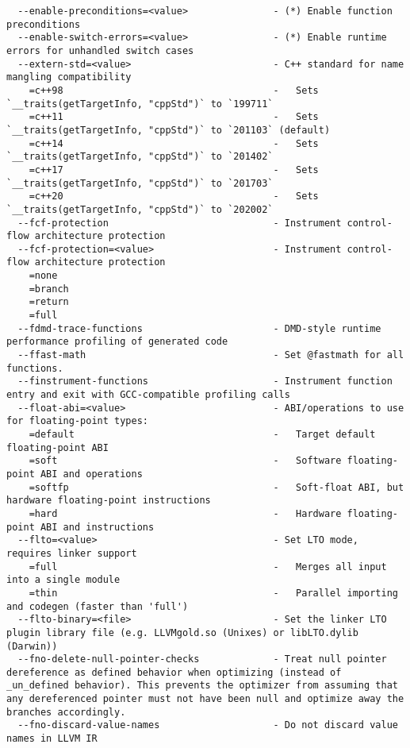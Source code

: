 \documentclass{studrep}
\begin{document}
\begin{verbatim}
  --enable-preconditions=<value>               - (*) Enable function preconditions
  --enable-switch-errors=<value>               - (*) Enable runtime errors for unhandled switch cases
  --extern-std=<value>                         - C++ standard for name mangling compatibility
    =c++98                                     -   Sets `__traits(getTargetInfo, "cppStd")` to `199711`
    =c++11                                     -   Sets `__traits(getTargetInfo, "cppStd")` to `201103` (default)
    =c++14                                     -   Sets `__traits(getTargetInfo, "cppStd")` to `201402`
    =c++17                                     -   Sets `__traits(getTargetInfo, "cppStd")` to `201703`
    =c++20                                     -   Sets `__traits(getTargetInfo, "cppStd")` to `202002`
  --fcf-protection                             - Instrument control-flow architecture protection
  --fcf-protection=<value>                     - Instrument control-flow architecture protection
    =none
    =branch
    =return
    =full
  --fdmd-trace-functions                       - DMD-style runtime performance profiling of generated code
  --ffast-math                                 - Set @fastmath for all functions.
  --finstrument-functions                      - Instrument function entry and exit with GCC-compatible profiling calls
  --float-abi=<value>                          - ABI/operations to use for floating-point types:
    =default                                   -   Target default floating-point ABI
    =soft                                      -   Software floating-point ABI and operations
    =softfp                                    -   Soft-float ABI, but hardware floating-point instructions
    =hard                                      -   Hardware floating-point ABI and instructions
  --flto=<value>                               - Set LTO mode, requires linker support
    =full                                      -   Merges all input into a single module
    =thin                                      -   Parallel importing and codegen (faster than 'full')
  --flto-binary=<file>                         - Set the linker LTO plugin library file (e.g. LLVMgold.so (Unixes) or libLTO.dylib (Darwin))
  --fno-delete-null-pointer-checks             - Treat null pointer dereference as defined behavior when optimizing (instead of _un_defined behavior). This prevents the optimizer from assuming that any dereferenced pointer must not have been null and optimize away the branches accordingly.
  --fno-discard-value-names                    - Do not discard value names in LLVM IR

\end{verbatim}
\end{document}
